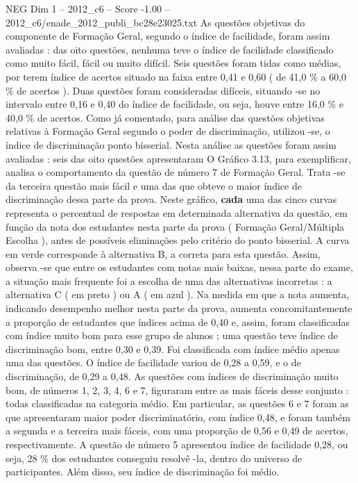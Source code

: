 \begin{textsample}{NEG Dim 1 – 2012\_c6 – Score -1.00 – 2012\_c6/enade\_2012\_publi\_bc28e23025.txt}
As questões objetivas do componente de Formação Geral, segundo o índice de facilidade, foram assim avaliadas : das oito questões, nenhuma teve o índice de facilidade classificado como muito fácil, fácil ou muito difícil.
Seis questões foram tidas como médias, por terem índice de acertos situado na faixa entre 0,41 e 0,60 ( de 41,0 \% a 60,0 \% de acertos ).
Duas questões foram consideradas difíceis, situando -se no intervalo entre 0,16 e 0,40 do índice de facilidade, ou seja, houve entre 16,0 \% e 40,0 \% de acertos.
Como já comentado, para análise das questões objetivas relativas à Formação Geral segundo o poder de discriminação, utilizou -se, o índice de discriminação ponto bisserial.
Nesta análise as questões foram assim avaliadas : seis das oito questões apresentaram O Gráfico 3.13, para exemplificar, analisa o comportamento da questão de número 7 de Formação Geral.
Trata -se da terceira questão mais fácil e uma das que obteve o maior índice de discriminação dessa parte da prova.
Neste gráfico, \textbf{cada} uma das cinco curvas representa o percentual de respostas em determinada alternativa da questão, em função da nota dos estudantes nesta parte da prova ( Formação Geral/Múltipla Escolha ), antes de possíveis eliminações pelo critério do ponto bisserial.
A curva em verde corresponde à alternativa B, a correta para esta questão.
Assim, observa -se que entre os estudantes com notas mais baixas, nessa parte do exame, a situação mais frequente foi a escolha de uma das alternativas incorretas : a alternativa C ( em preto ) ou A ( em azul ).
Na medida em que a nota aumenta, indicando desempenho melhor nesta parte da prova, aumenta concomitantemente a proporção de estudantes que índices acima de 0,40 e, assim, foram classificadas com índice muito bom para esse grupo de alunos ; uma questão teve índice de discriminação bom, entre 0,30 e 0,39.
Foi classificada com índice médio apenas uma das questões.
O índice de facilidade variou de 0,28 a 0,59, e o de discriminação, de 0,29 a 0,48.
As questões com índices de discriminação muito bom, de números 1, 2, 3, 4, 6 e 7, figuraram entre as mais fáceis desse conjunto : todas classificadas na categoria médio.
Em particular, as questões 6 e 7 foram as que apresentaram maior poder discriminatório, com índice 0,48, e foram também a segunda e a terceira mais fáceis, com uma proporção de 0,56 e 0,49 de acertos, respectivamente.
A questão de número 5 apresentou índice de facilidade 0,28, ou seja, 28 \% dos estudantes conseguiu resolvê -la, dentro do universo de participantes.
Além disso, seu índice de discriminação foi médio.

\end{textsample}
